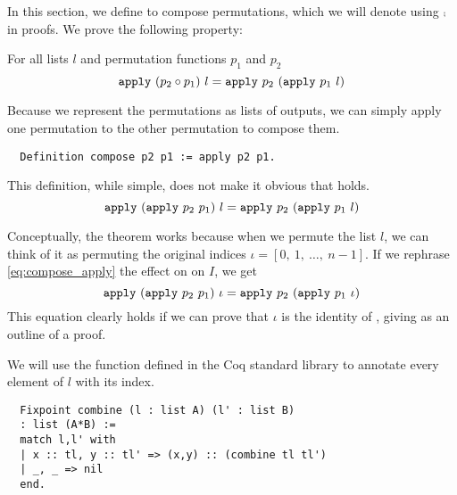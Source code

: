 \documentclass[sigplan,10pt,anonymous,review]{thesis}
\begin{document}
In this section, we define  to compose permutations,
which we will denote using $\comp$ in proofs. We prove the following
property:

\begin{theorem}
  For all lists $l$ and permutation functions $p_1$ and $p_2$
  \begin{equation*}
    \texttt{\textup{apply}}~(p_2 \circ p_1)~l = \texttt{\textup{apply}}~p_2~(\texttt{\textup{apply}}~p_1~l)
  \end{equation*}
\end{theorem}

Because we represent the permutations as lists of outputs, we can
simply apply one permutation to the other permutation to compose them.
\begin{lstlisting}
  Definition compose p2 p1 := apply p2 p1.
\end{lstlisting}
This definition, while simple, does not make it obvious that
 holds.
\begin{equation}
  \label{eq:compose_apply}
  \texttt{\textup{apply}}~(\texttt{\textup{apply}}~p_2~p_1)~l = \texttt{\textup{apply}}~p_2~(\texttt{\textup{apply}}~p_1~l)
\end{equation}

Conceptually, the theorem works because when we permute the list $l$,
we can think of it as permuting the original indices $\iota =
[0,~1,~\ldots,~n-1]$. If we rephrase \cref{eq:compose_apply} the effect on
on $I$, we get
\begin{equation*}
  \texttt{\textup{apply}}~(\texttt{\textup{apply}}~p_2~p_1)~\iota = \texttt{\textup{apply}}~p_2~(\texttt{\textup{apply}}~p_1~\iota)
\end{equation*}
This equation clearly holds if we can prove that $\iota$ is the identity
of , giving as an outline of a proof.

We will use the function  defined in the Coq standard
library to annotate every element of $l$ with its index.
\begin{lstlisting}
  Fixpoint combine (l : list A) (l' : list B)
  : list (A*B) :=
  match l,l' with
  | x :: tl, y :: tl' => (x,y) :: (combine tl tl')
  | _, _ => nil
  end.
\end{lstlisting}
\end{document}
